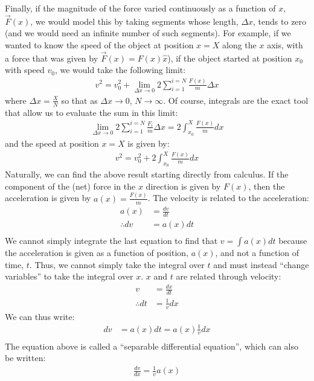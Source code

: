 Finally, if the magnitude of the force varied continuously as a function of $x$, $\vec F(x)$, we would model this by taking segments whose length, $\Delta x$, tends to zero (and we would need an infinite number of such segments). For example, if we wanted to know the speed of the object at position $x=X$ along the $x$ axis, with a force that was given by $\vec F(x)=F(x)\hat x$), if the object started at position $x_0$ with speed $v_0$, we would take the following limit:
\begin{align*}
v^2 = v_0^2 + \lim_{\Delta x \to 0} 2\sum_{i=1}^{i=N} \frac{F(x)}{m}\Delta x
\end{align*}
where $\Delta x = \frac{X}{N}$ so that as $\Delta x\to 0$, $N\to\infty$. Of course, integrals are the exact tool that allow us to evaluate the sum in this limit:
\begin{align*}
\lim_{\Delta x \to 0} 2\sum_{i=1}^{i=N} \frac{F_i}{m}\Delta x =2 \int_{x_0}^{X}\frac{F(x)}{m}dx 
\end{align*}
and the speed at position $x=X$ is given by:
\begin{align*}
v^2 = v_0^2 + 2 \int_{x_0}^{X}\frac{F(x)}{m}dx 
\end{align*}
Naturally, we can find the above result starting directly from calculus. If the component of the (net) force in the $x$ direction is given by $F(x)$, then the  acceleration is given by $a(x) = \frac{F(x)}{m}$. The velocity is related to the acceleration:
\begin{align*}
a(x) &= \frac{dv}{dt}\\
\therefore dv &= a(x)dt\\
\end{align*}
We cannot simply integrate the last equation to find that $v=\int a(x)dt$ because the acceleration is given as a function of position, $a(x)$, and not a function of time, $t$. Thus, we cannot simply take the integral over $t$ and must instead ``change variables'' to take the integral over $x$. $x$ and $t$ are related through velocity:
\begin{align*}
v &= \frac{dx}{dt}\\
\therefore dt &= \frac{1}{v}dx
\end{align*}
We can thus write:
\begin{align*}
dv &= a(x)dt = a(x)\frac{1}{v}dx \\
\end{align*}
The equation above is called a ``separable differential equation'', which can also be written:
\begin{align*}
\frac{dv}{dx}=\frac{1}{v}a(x)
\end{align*}
